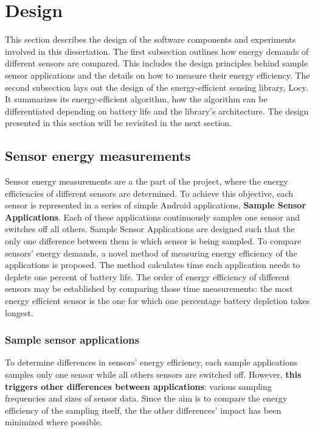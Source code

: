 \section{Design}
\label{s:design}
\hspace{10pt} This section describes the design of the software components and experiments involved in this dissertation. The first subsection outlines how energy demands of different sensors are compared. This includes the design principles behind sample sensor applications and the details on how to measure their energy efficiency. The second subsection lays out the design of the energy-efficient sensing library, Locy. It summarizes its energy-efficient algorithm, how the algorithm can be differentiated depending on battery life and the library's architecture. The design presented in this section will be revisited in the next section.

\subsection{Sensor energy measurements}
\label{s:design:measurements}
\hspace{10pt} Sensor energy measurements are a the part of the project, where the energy efficiencies of different sensors are determined. To achieve this objective, each sensor is represented in a series of simple Android applications, \textbf{Sample Sensor Applications}. Each of these applications continuously samples one sensor and switches off all others. Sample Sensor Applications are designed such that the only one difference between them is which sensor is being sampled. To compare sensors' energy demands, a novel method of measuring energy efficiency of the applications is proposed. The method calculates time each application needs to deplete one percent of battery life. The order of energy efficiency of different sensors may be established by comparing those time measurements: the most energy efficient sensor is the one for which one percentage battery depletion takes longest. 

\subsubsection{Sample sensor applications}
\label{s:design:measurements:sampleapps}
\hspace{10pt} To determine differences in sensors' energy efficiency, each sample applications samples only one sensor while all others sensors are switched off. However, \textbf{this triggers other differences between applications}: various sampling frequencies and sizes of sensor data. Since the aim is to compare the energy efficiency of the sampling itself, the the other differences' impact has been minimized where possible. 

